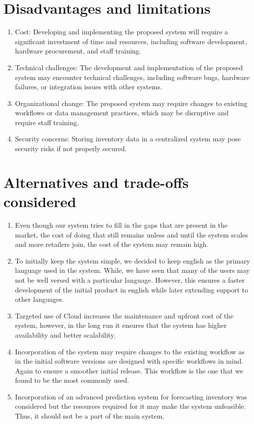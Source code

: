 \section{Disadvantages and limitations \label{Section::Disadvantagesandlimitations}}
\begin{enumerate}


    \item Cost: Developing and implementing the proposed system will require a significant investment of time and resources, including software development, hardware procurement, and staff training.

    \item Technical challenges: The development and implementation of the proposed system may encounter technical challenges, including software bugs, hardware failures, or integration issues with other systems.

    \item Organizational change: The proposed system may require changes to existing workflows or data management practices, which may be disruptive and require staff training.

    \item Security concerns: Storing inventory data in a centralized system may pose security risks if not properly secured.
\end{enumerate}

\section{Alternatives and trade-offs considered \label{Section::Alternativesandtradeoffsconsidered}}
\begin{enumerate}
    \item Even though our system tries to fill in the gaps that are present in the market, the cost of doing that still remains unless and until the system scales and more retailers join, the cost of the system may remain high.
    \item To initially keep the system simple, we decided to keep english as the primary language used in the system. While, we have seen that many of the users may not be well versed with a particular language. However, this ensures a faster development of the initial product in english while later extending support to other languages.
    \item Targeted use of Cloud increases the maintenance and upfront cost of the system, however, in the long run it ensures that the system has higher availability and better scalability.
    \item Incorporation of the system may require changes to the existing workflow as in the initial software versions are designed with specific workflows in mind. Again to ensure a smoother initial release. This workflow is the one that we found to be the most commonly used.
    \item Incorporation of an advanced prediction system for forecasting inventory was considered but the resources required for it may make the system unfeasible. Thus, it should not be a part of the main system. 
\end{enumerate}
\newpage
